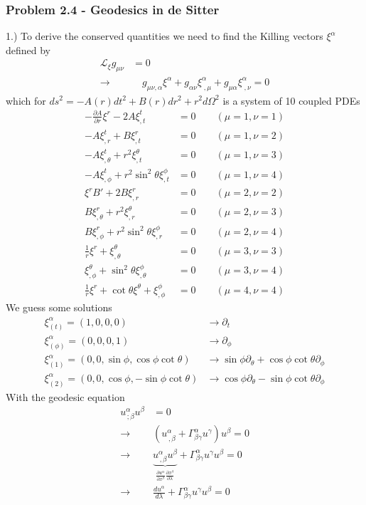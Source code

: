 \documentclass[10pt,a4paper]{article}
\theoremstyle{definition}
\begin{document}
\subsubsection{Problem 2.4 - Geodesics in de Sitter}
1.) To derive the conserved quantities we need to find the Killing vectors $\xi^\alpha$ defined by
\begin{align}
\mathcal{L}_\xi g_{\mu\nu}&=0\\
\rightarrow &\quad g_{\mu\nu,\alpha}\xi^\alpha+g_{\alpha\nu} \xi^\alpha_{\;,\mu}+g_{\mu\alpha} \xi^\alpha_{\;,\nu}=0
\end{align}
which for $ds^2=-A(r)dt^2+B(r)dr^2+r^2d\Omega^2$ is a system of 10 coupled PDEs
\begin{align}
-\frac{\partial A}{\partial r}\xi^r-2A\xi^t_{,t}&=0	\qquad(\mu=1,\nu=1)\\
-A\xi^t_{,r}+B\xi^r_{,t}&=0							\qquad(\mu=1,\nu=2)\\
-A\xi^t_{,\theta}+r^2\xi^\theta_{,t}&=0		\qquad(\mu=1,\nu=3)\\
-A\xi^t_{,\phi}+r^2\sin^2\theta\xi^\phi_{,t}&=0	\qquad(\mu=1,\nu=4)\\
%
\xi^rB'+2B\xi^r_{,r}&=0								\qquad(\mu=2,\nu=2)\\
B\xi^r_{,\theta}+r^2\xi^\theta_{,r}&=0			\qquad(\mu=2,\nu=3)\\
B\xi^r_{,\phi}+r^2\sin^2\theta\xi^\phi_{,r}&=0	\qquad(\mu=2,\nu=4)\\
%
\frac{1}{r}\xi^r+\xi^\theta_{,\theta}&=0			\qquad(\mu=3,\nu=3)\\
\xi^\theta_{,\phi}+\sin^2\theta\xi^\phi_{,\theta}&=0		\qquad(\mu=3,\nu=4)\\
%
\frac{1}{r}\xi^r+\cot\theta\xi^\theta+\xi^\phi_{,\phi}&=0	\qquad(\mu=4,\nu=4)
\end{align}
We guess some solutions
\begin{align}
\xi^\alpha_{(t)}=(1,0,0,0)&\rightarrow\partial_t\\
\xi^\alpha_{(\phi)}=(0,0,0,1)&\rightarrow\partial_\phi\\
\xi^\alpha_{(1)}=(0,0,\sin\phi,\cos\phi\cot\theta)&\rightarrow\sin\phi\partial_\theta+\cos\phi\cot\theta\partial_\phi\\
\xi^\alpha_{(2)}=(0,0,\cos\phi,-\sin\phi\cot\theta)&\rightarrow\cos\phi\partial_\theta-\sin\phi\cot\theta\partial_\phi
\end{align}
With the geodesic equation
\begin{align}
u^\alpha_{\,;\beta}u^\beta&=0\\
\rightarrow\quad& (u^\alpha_{\,,\beta}+\Gamma^\alpha_{\beta\gamma}u^\gamma)u^\beta=0\\
\rightarrow\quad& \underbrace{u^\alpha_{\,,\beta}u^\beta}_{\frac{\partial u^\alpha}{\partial x^\beta}\frac{\partial x^\beta}{\partial \lambda}}+\Gamma^\alpha_{\beta\gamma}u^\gamma u^\beta=0\\
\rightarrow\quad& \frac{du^\alpha}{d\lambda}+\Gamma^\alpha_{\beta\gamma}u^\gamma u^\beta=0
\end{align}
\end{document}
